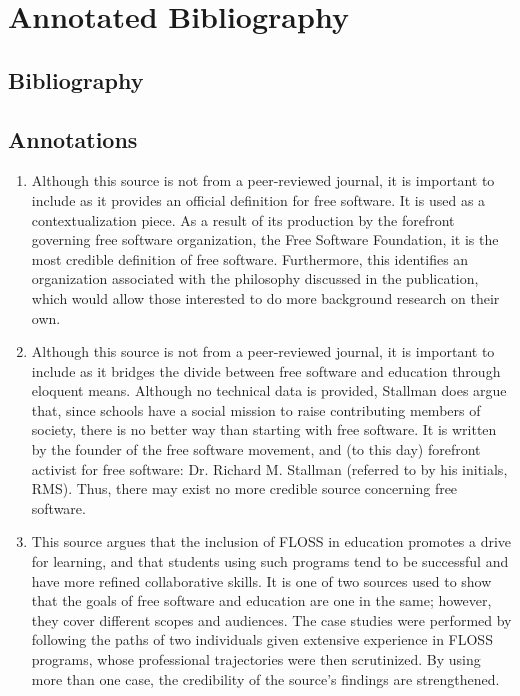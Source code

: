 \documentclass[conference]{IEEEtran}
\begin{document}
\section{Annotated Bibliography}

\subsection{Bibliography}



\subsection{Annotations}

\begin{enumerate}

  \item Although this source is not from a peer-reviewed journal, it is important to include as it provides an official definition for free software. It is used as a contextualization piece. As a result of its production by the forefront governing free software organization, the Free Software Foundation, it is the most credible definition of free software. Furthermore, this identifies an organization associated with the philosophy discussed in the publication, which would allow those interested to do more background research on their own.

  \item Although this source is not from a peer-reviewed journal, it is important to include as it bridges the divide between free software and education through eloquent means. Although no technical data is provided, Stallman does argue that, since schools have a social mission to raise contributing members of society, there is no better way than starting with free software. It is written by the founder of the free software movement, and (to this day) forefront activist for free software: Dr. Richard M. Stallman (referred to by his initials, RMS). Thus, there may exist no more credible source concerning free software.

  \item This source argues that the inclusion of FLOSS in education promotes a drive for learning, and that students using such programs tend to be successful and have more refined collaborative skills. It is one of two sources used to show that the goals of free software and education are one in the same; however, they cover different scopes and audiences. The case studies were performed by following the paths of two individuals given extensive experience in FLOSS programs, whose professional trajectories were then scrutinized. By using more than one case, the credibility of the source's findings are strengthened.

\end{enumerate}
\end{document}
